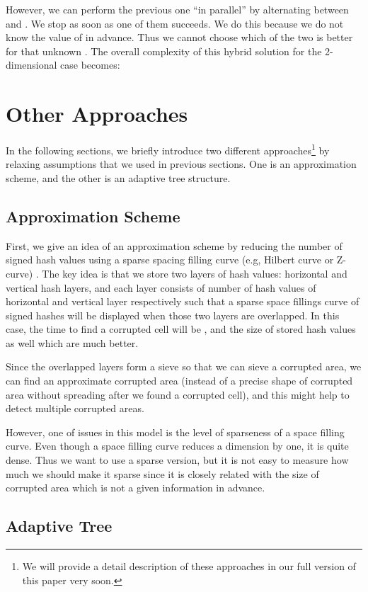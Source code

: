 \documentclass{llncs}
\begin{document}
However, we can perform the previous one ``in parallel'' 
by alternating between  and . We stop as soon as one of them succeeds.
We do this because we do not know the value of  in advance.
Thus we cannot choose which of the two is better for that unknown .  
The overall complexity of this hybrid solution for the 2-dimensional case becomes:



\section{Other Approaches}
\label{OtherApproaches}
In the following sections, we briefly introduce two different approaches\footnote{We will provide a detail description of these approaches in our full version of this paper very soon.} by relaxing assumptions that we used in previous sections.
One is an approximation scheme, and the other is an adaptive tree structure.

\subsection{Approximation Scheme}
First, we give an idea of an approximation scheme 
by reducing the number of signed hash values 
using a sparse spacing filling curve (e.g, Hilbert curve or Z-curve) \cite{LiJe00,OrMa98}.
The key idea is that we store two layers of hash values: horizontal and vertical hash layers,
and each layer consists of  number of hash values of horizontal and vertical layer
respectively such that a sparse space fillings curve of signed hashes will be displayed 
when those two layers are overlapped.
In this case, the time to find a corrupted cell  will be , 
and the size of stored hash values  as well which are much better. 

Since the overlapped layers form a sieve so that we can sieve a corrupted area,
we can find an approximate corrupted area  
(instead of a precise shape of corrupted area  
without spreading after we found a corrupted cell),
and this might help to detect multiple corrupted areas.

However, one of issues in this model is the level of sparseness of a space filling curve.
Even though a space filling curve reduces a dimension by one, it is quite dense. 
Thus we want to use a sparse version, 
but it is not easy to measure how much we should make it sparse 
since it is closely related with the size of corrupted area which is not a given information in advance.


\subsection{Adaptive Tree}
\end{document}
